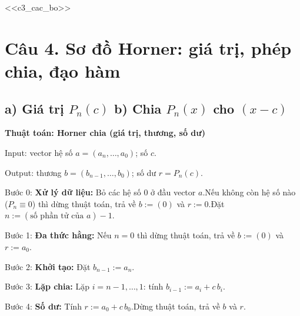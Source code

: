 \documentclass[11pt,a4paper]{article}
\newenvironment{thuattoan}[1]
  {\par\medskip\noindent\textbf{Thuật toán: #1}\begin{description}[style=standard,align=left,leftmargin=4.3em,labelwidth=3.9em,labelsep=0.4em,itemsep=1pt,topsep=3pt,font=\normalfont\bfseries]}
  {\end{description}}
\begin{document}
<<c3_cac_bo>>

\section{Câu 4. Sơ đồ Horner: giá trị, phép chia, đạo hàm}

\subsection{a) Giá trị $P_n(c)$ \quad b) Chia $P_n(x)$ cho $(x-c)$}
\begin{thuattoan}{Horner chia (giá trị, thương, số dư)}
\item[Input:] vector hệ số $a=(a_n,\dots,a_0)$; số $c$.
\item[Output:] thương $b=(b_{n-1},\dots,b_0)$; số dư $r=P_n(c)$.
\item[Bước 0:] \textbf{Xử lý dữ liệu:} Bỏ các hệ số $0$ ở đầu vector $a$.\newline Nếu không còn hệ số nào ($P_n\equiv0$) thì dừng thuật toán, trả về $b:=(0)$ và $r:=0$.\newline Đặt $n:=(\text{số phần tử của }a)-1$.
\item[Bước 1:] \textbf{Đa thức hằng:} Nếu $n=0$ thì dừng thuật toán, trả về $b:=(0)$ và $r:=a_0$.
\item[Bước 2:] \textbf{Khởi tạo:} Đặt $b_{n-1}:=a_n$.
\item[Bước 3:] \textbf{Lặp chia:} Lặp $i=n-1,\dots,1$: tính $b_{i-1}:=a_i+c\,b_i$.
\item[Bước 4:] \textbf{Số dư:} Tính $r:=a_0+c\,b_0$.\newline Dừng thuật toán, trả về $b$ và $r$.
\end{thuattoan}
\end{document}
